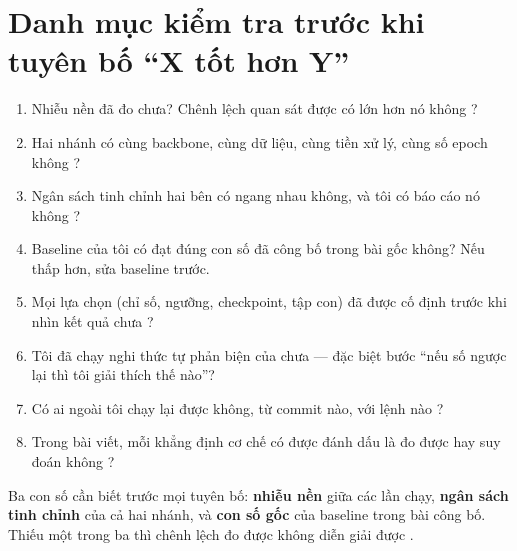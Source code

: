 \documentclass[../hieu-suat.tex]{subfiles}
\begin{document}
\section{Danh mục kiểm tra trước khi tuyên bố ``X tốt hơn Y''}

\begin{enumerate}
\item Nhiễu nền đã đo chưa? Chênh lệch quan sát được có lớn hơn nó không \cite{bouthillier2021}?
\item Hai nhánh có cùng backbone, cùng dữ liệu, cùng tiền xử lý, cùng số epoch không \cite{musgrave2020}?
\item Ngân sách tinh chỉnh hai bên có ngang nhau không, và tôi có báo cáo nó không \cite{melis2018}?
\item Baseline của tôi có đạt đúng con số đã công bố trong bài gốc không? Nếu thấp hơn, sửa baseline trước.
\item Mọi lựa chọn (chỉ số, ngưỡng, checkpoint, tập con) đã được cố định trước khi nhìn kết quả chưa \cite{simmons2011}?
\item Tôi đã chạy nghi thức tự phản biện của  chưa --- đặc biệt bước ``nếu số ngược lại thì tôi giải thích thế nào''?
\item Có ai ngoài tôi chạy lại được không, từ commit nào, với lệnh nào \cite{pineau2021}?
\item Trong bài viết, mỗi khẳng định cơ chế có được đánh dấu là đo được hay suy đoán không \cite{lipton2019}?
\end{enumerate}

\begin{cannho}
Ba con số cần biết trước mọi tuyên bố: \textbf{nhiễu nền} giữa các lần chạy, \textbf{ngân sách tinh chỉnh} của cả hai nhánh, và \textbf{con số gốc} của baseline trong bài công bố. Thiếu một trong ba thì chênh lệch đo được không diễn giải được \nM{}.
\end{cannho}

\begin{traloi}
\end{traloi}
\end{document}
